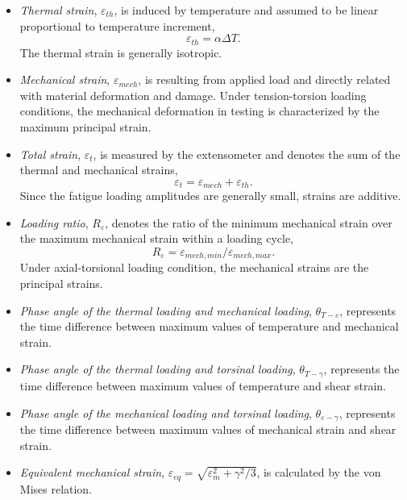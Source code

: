 \begin{itemize}
  \item {\em Thermal strain}, $\varepsilon_{th}$, is induced by temperature and assumed to be linear proportional to temperature increment, 
  \begin{equation}
  \varepsilon_{th}=\alpha\Delta T.
  \label{Equ:thermal_strain}
  \end{equation} 
  The thermal strain is generally isotropic.
  \item {\em Mechanical strain}, $\varepsilon_{mech}$, is resulting from applied load and directly related with material deformation and damage. Under tension-torsion loading conditions, the mechanical deformation in testing is characterized by the maximum principal strain.
  \item {\em Total strain}, $\varepsilon_t$, is measured by the extensometer and denotes the sum of the thermal and mechanical strains, 
  \begin{equation}
  \varepsilon_t=\varepsilon_{mech}+\varepsilon_{th}.
  \label{Equ:total_strain}
  \end{equation}
  Since the fatigue loading amplitudes are generally small, strains are additive.
  \item {\em Loading ratio}, $R_{\varepsilon}$, denotes the ratio of the minimum mechanical strain over the maximum mechanical strain within a loading cycle,
  \begin{equation}
  R_{\varepsilon}=\varepsilon_{mech,min}/\varepsilon_{mech,max}.
  \end{equation}
  Under axial-torsional loading condition, the mechanical strains are the principal strains.
  \item {\em Phase angle of the thermal loading and mechanical loading}, $\theta_{T-\varepsilon}$, represents the time difference between maximum values of temperature and mechanical strain.
  \item {\em Phase angle of the thermal loading and torsinal loading}, $\theta_{T-\gamma}$, represents the time difference between maximum values of temperature and shear strain.
  \item {\em Phase angle of the mechanical loading and torsinal loading}, $\theta_{\varepsilon-\gamma}$, represents the time difference between maximum values of mechanical strain and shear strain.
  \item {\em Equivalent mechanical strain}, $\varepsilon_{eq}=\sqrt {\varepsilon _m^2 + {\gamma ^2}/3}$, is calculated by the von Mises relation\cite{Pol1991Cyclic}.
\end{itemize}

